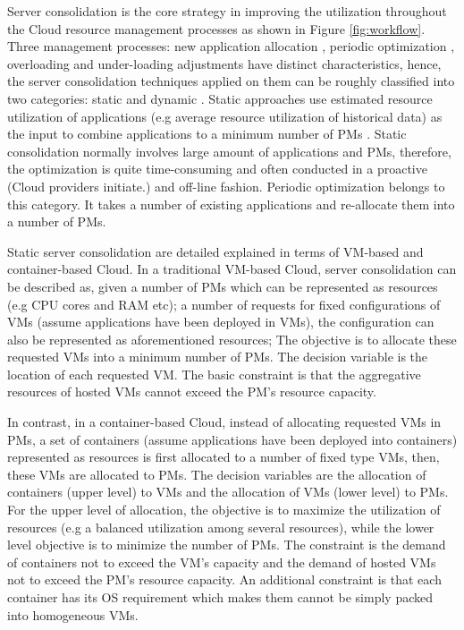 Server consolidation \cite{Varasteh:2015fu} is the core strategy in improving the utilization throughout the Cloud resource management processes as shown in Figure \ref{fig:workflow}. Three management processes: new application allocation \cite{Jennings:2015ht}, periodic optimization \cite{Mishra:2012kx}, overloading and under-loading adjustments \cite{Mishra:2012kx} have distinct characteristics, hence, the server consolidation techniques applied on them can be roughly classified into two categories: static \cite{Xiao:2015ik} and dynamic \cite{Beloglazov:2012bw}.
Static approaches use estimated resource utilization of applications (e.g average resource utilization of historical data) as the input to combine applications to a minimum number of PMs \cite{Mishra:2012kx}. Static consolidation normally involves large amount of applications and PMs, therefore, the optimization is quite time-consuming and often conducted in a proactive (Cloud providers initiate.) and off-line fashion. Periodic optimization belongs to this category. It takes a number of existing applications and re-allocate them into a number of PMs. 

Static server consolidation are detailed explained in terms of VM-based and container-based Cloud. In a traditional VM-based Cloud, server consolidation can be described as, given a number of  PMs which can be represented as resources (e.g CPU cores and RAM etc); a number of requests for fixed configurations of VMs (assume applications have been deployed in VMs), the configuration can also be represented as aforementioned resources; The objective is to allocate these requested VMs into a minimum number of PMs. The decision variable is the location of each requested VM. The basic constraint is that the aggregative resources  of hosted VMs cannot exceed the PM's resource capacity. 

In contrast, in a container-based Cloud, instead of allocating requested VMs in PMs, a set of containers (assume applications have been deployed into containers) represented as resources is first allocated to a number of fixed type VMs, then, these VMs are allocated to PMs. The decision variables are the allocation of containers (upper level) to VMs and the allocation of VMs (lower level) to PMs. For the upper level of allocation, the objective is to maximize the utilization of resources (e.g a balanced utilization among several resources), while the lower level objective is to minimize the number of PMs. The constraint is the demand of containers not to exceed the VM's capacity and the demand of hosted VMs not to exceed the PM's resource capacity. An additional constraint is that each container has its OS requirement which makes them cannot be simply packed into homogeneous VMs. 

